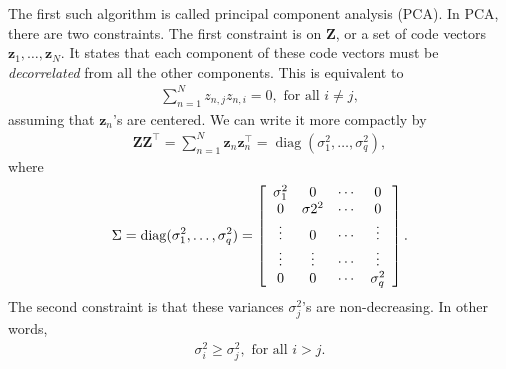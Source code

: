 \documentclass{report}
\newcommand{\vect}[1]{\mathbf{#1}}
\newcommand{\matr}[1]{\mathbf{#1}}
\newcommand{\diag}[0]{\operatorname{diag}}
\newcommand{\vz}[0]{\vect{z}}
\newcommand{\mZ}[0]{\matr{Z}}
\begin{document}
The first such algorithm is called principal component analysis (PCA). In PCA,
there are two constraints. The first constraint is on $\mZ$, or a set of code
vectors $\vz_1, \ldots, \vz_N$. It states that each component of these code
vectors must be {\it decorrelated} from all the other components. This is
equivalent to 
\begin{align*}
    \sum_{n=1}^N z_{n,j} z_{n,i} = 0,\text{ for all }i \neq j,
\end{align*}
assuming that $\vz_n$'s are centered. We can write it more compactly by
\begin{align*}
    \mZ \mZ^\top = \sum_{n=1}^N \vz_{n} \vz_n^\top = \diag(\sigma_1^2, \ldots, \sigma_q^2),
\end{align*}
where 
\begin{align*}
    \Sigma = \diag(\sigma_1^2, \ldots, \sigma_q^2) = 
    \left[
        \begin{array}{c c c c}
            \sigma_1^2 & 0 & \cdots & 0 \\
            0 & \sigma2^2 & \cdots & 0 \\
            \vdots & 0 & \cdots & \vdots \\
            \vdots & \vdots & \cdots & \vdots \\
            0 & 0 & \cdots & \sigma_q^2 
        \end{array}
    \right].
\end{align*}
The second constraint is that these variances $\sigma_j^2$'s are non-decreasing.
In other words, 
\begin{align*}
    \sigma_i^2 \geq \sigma_j^2,\text{ for all }i > j.
\end{align*}
\end{document}
